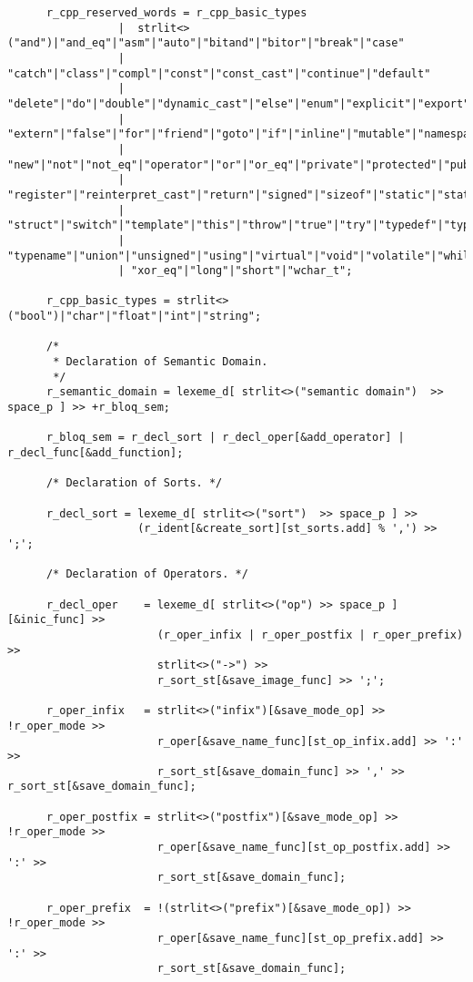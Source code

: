 \begin{center}
\begin{lstlisting}
      r_cpp_reserved_words = r_cpp_basic_types
                 |  strlit<>("and")|"and_eq"|"asm"|"auto"|"bitand"|"bitor"|"break"|"case"
                 | "catch"|"class"|"compl"|"const"|"const_cast"|"continue"|"default"
                 | "delete"|"do"|"double"|"dynamic_cast"|"else"|"enum"|"explicit"|"export"
                 | "extern"|"false"|"for"|"friend"|"goto"|"if"|"inline"|"mutable"|"namespace"
                 | "new"|"not"|"not_eq"|"operator"|"or"|"or_eq"|"private"|"protected"|"public"
                 | "register"|"reinterpret_cast"|"return"|"signed"|"sizeof"|"static"|"static_cast"
                 | "struct"|"switch"|"template"|"this"|"throw"|"true"|"try"|"typedef"|"typeid"
                 | "typename"|"union"|"unsigned"|"using"|"virtual"|"void"|"volatile"|"while"|"xor"
                 | "xor_eq"|"long"|"short"|"wchar_t";

      r_cpp_basic_types = strlit<>("bool")|"char"|"float"|"int"|"string";

      /*
       * Declaration of Semantic Domain.
       */
      r_semantic_domain = lexeme_d[ strlit<>("semantic domain")  >> space_p ] >> +r_bloq_sem;

      r_bloq_sem = r_decl_sort | r_decl_oper[&add_operator] | r_decl_func[&add_function];

      /* Declaration of Sorts. */

      r_decl_sort = lexeme_d[ strlit<>("sort")  >> space_p ] >>
                    (r_ident[&create_sort][st_sorts.add] % ',') >> ';';

      /* Declaration of Operators. */

      r_decl_oper    = lexeme_d[ strlit<>("op") >> space_p ][&inic_func] >>
                       (r_oper_infix | r_oper_postfix | r_oper_prefix) >>
                       strlit<>("->") >>
                       r_sort_st[&save_image_func] >> ';';

      r_oper_infix   = strlit<>("infix")[&save_mode_op] >> !r_oper_mode >>
                       r_oper[&save_name_func][st_op_infix.add] >> ':' >>
                       r_sort_st[&save_domain_func] >> ',' >> r_sort_st[&save_domain_func];

      r_oper_postfix = strlit<>("postfix")[&save_mode_op] >> !r_oper_mode >>
                       r_oper[&save_name_func][st_op_postfix.add] >> ':' >>
                       r_sort_st[&save_domain_func];

      r_oper_prefix  = !(strlit<>("prefix")[&save_mode_op]) >> !r_oper_mode >>
                       r_oper[&save_name_func][st_op_prefix.add] >> ':' >>
                       r_sort_st[&save_domain_func];


\end{lstlisting}
\end{center}

